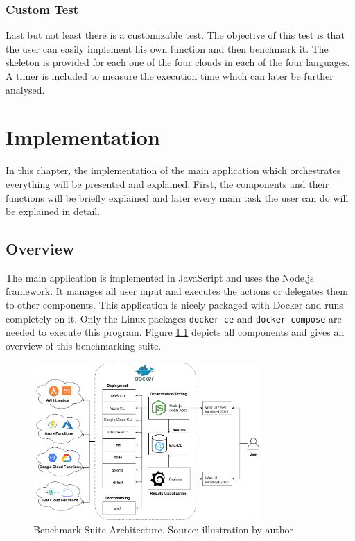 \subsection{Custom Test}
Last but not least there is a customizable test. The objective of this test is that the user can easily implement his own function and then benchmark it. The skeleton is provided for each one of the four clouds in each of the four languages. A timer is included to measure the execution time which can later be further analysed.

\chapter{Implementation}
In this chapter, the implementation of the main application which orchestrates everything will be presented and explained. First, the components and their functions will be briefly explained and later every main task the user can do will be explained in detail.

\section{Overview}
The main application is implemented in JavaScript and uses the Node.js framework. It manages all user input and executes the actions or delegates them to other components. This application is nicely packaged with Docker and runs completely on it. Only the Linux packages \texttt{docker-ce} and \texttt{docker-compose} are needed to execute this program. Figure \ref{fig:architecture} depicts all components and gives an overview of this benchmarking suite.

\begin{figure}[htp]
\begin{center}
\includegraphics[width=0.77\textwidth]{bilder/main_app.png}
\captionsetup{justification=centering, labelfont=bf}
\caption[Benchmark Suite Architecture]{Benchmark Suite Architecture. Source: illustration by author}
\label{fig:architecture}
\end{center}
\end{figure}

